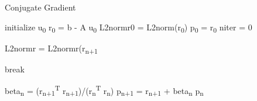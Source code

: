 \documentclass{article}
\begin{document}
\begin{algorithm}
\caption{Conjugate Gradient}
\begin{algorithmic}[1]

\State initialize u\textsubscript{0}
\State r\textsubscript{0} = b - A u\textsubscript{0}
\State L2normr0 = L2norm(r\textsubscript{0})
\State p\textsubscript{0} = r\textsubscript{0}
\State niter = 0

\State L2normr = L2normr(r\textsubscript{n+1}

\State break
\EndIf

\State beta\textsubscript{n} = (r\textsubscript{n+1}\textsuperscript{T} r\textsubscript{n+1})/(r\textsubscript{n}\textsuperscript{T} r\textsubscript{n})
\State p\textsubscript{n+1} = r\textsubscript{n+1} + beta\textsubscript{n} p\textsubscript{n}

\EndWhile

\end{algorithmic}
\end{algorithm} 
\end{document}

